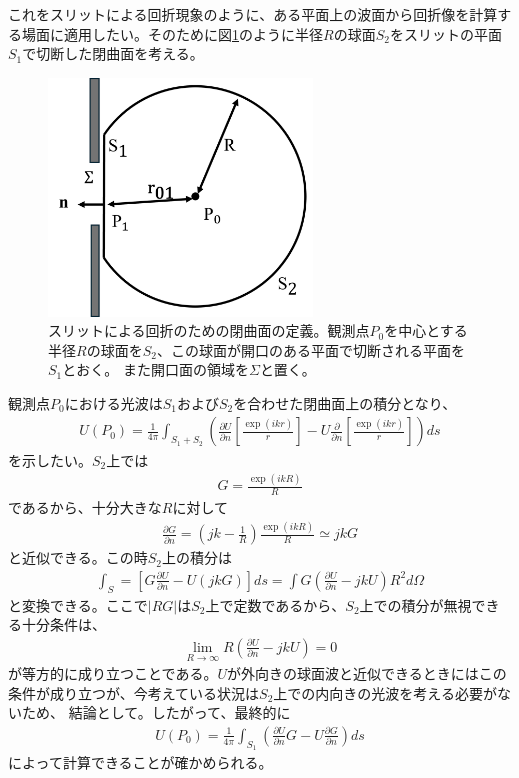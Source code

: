 \documentclass[a4paper,11pt,uplatex]{jsbook}
\begin{document}
これをスリットによる回折現象のように、ある平面上の波面から回折像を計算する場面に適用したい。そのために図\ref{fig:diff_kir}のように半径$R$の球面$S_2$をスリットの平面$S_1$で切断した閉曲面を考える。
\begin{figure}[H]
  \centering
  \includegraphics[width=7cm]{image/2-diffraction_kir.png}
  \caption[スリットによる回折の模式図]{スリットによる回折のための閉曲面の定義。観測点$P_0$を中心とする半径$R$の球面を$S_2$、この球面が開口のある平面で切断される平面を$S_1$とおく。
  また開口面の領域を$\Sigma$と置く。}\label{fig:diff_kir}
\end{figure}
観測点$P_0$における光波は$S_1$および$S_2$を合わせた閉曲面上の積分となり、
\begin{eqnarray}
  U(P_0) = \frac{1}{4\pi}\int_{S_1+S_2} \left( \frac{\partial U}{\partial n} \left[ \frac{\exp(ikr)}{r} \right] - U\frac{\partial}{\partial n} \left[ \frac{\exp(ikr)}{r}\right] \right) ds
\end{eqnarray}
を示したい。$S_2$上では
\begin{eqnarray}
  G = \frac{\exp(ikR)}{R} 
\end{eqnarray}
であるから、十分大きな$R$に対して
\begin{eqnarray}
  \frac{\partial G}{\partial n} = \left( jk-\frac{1}{R}\right)\frac{\exp(ikR)}{R} \simeq jkG
\end{eqnarray}
と近似できる。この時$S_2$上の積分は
\begin{eqnarray}
  \int_S  = \left[ G\frac{\partial U}{\partial n} - U (jkG)\right]ds = \int G(\frac{\partial U}{\partial n} -jkU)R^2d\Omega
\end{eqnarray}
と変換できる。ここで$|RG|$は$S_2$上で定数であるから、$S_2$上での積分が無視できる十分条件は、
\begin{eqnarray}
  \lim_{R\rightarrow \infty} R\left(\frac{\partial U}{\partial n} -jkU \right) = 0
\end{eqnarray}
が等方的に成り立つことである。$U$が外向きの球面波と近似できるときにはこの条件が成り立つが、今考えている状況は$S_2$上での内向きの光波を考える必要がないため、
結論として。したがって、最終的に
\begin{eqnarray}
  U(P_0) = \frac{1}{4\pi}\int_{S_1} \left( \frac{\partial U}{\partial n} G - U\frac{\partial G}{\partial n}  \right) ds
\end{eqnarray}
によって計算できることが確かめられる。
\end{document}
